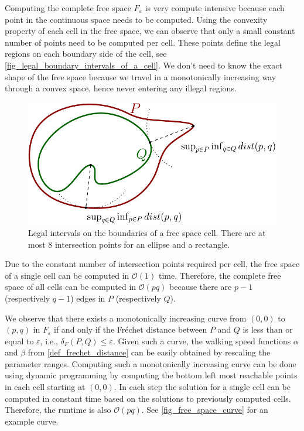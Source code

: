 \documentclass[
oneside,
fontsize=11pt
]{scrartcl}
\begin{document}
Computing the complete free space $F_\varepsilon$ is very compute intensive 
because each point in the continuous space needs to be computed. 
Using the convexity property of each cell in the free space,
we can observe that only a small constant number of points need to be computed per cell. 
These points define the legal regions on each boundary side of the cell, see \autoref{fig_legal_boundary_intervals_of_a_cell}. 
We don't need to know the exact shape of the free space 
because we travel in a monotonically increasing way through a convex space,
hence never entering any illegal regions.

\begin{figure}[ht]
  \centering
  \includegraphics[width=\textwidth]{images/hausdorff/hausdorff-distance-example.pdf}
  \caption[Legal intervals on free space cell boundary]{
    Legal intervals on the boundaries of a free space cell. 
    There are at most 8 intersection points for an ellipse and a rectangle.}
  \label{fig_legal_boundary_intervals_of_a_cell}
\end{figure}

Due to the constant number of intersection points required per cell, 
the free space of a single cell can be computed in $\mathcal{O}(1)$ time.
Therefore, the complete free space of all cells can be computed in $\mathcal{O}(pq)$
because there are $p-1$ (respectively $q-1$) edges in $P$ (respectively $Q$).

We observe that there exists 
a monotonically increasing curve from $(0,0)$ to $(p,q)$ in $F_\varepsilon$
if and only if the Fréchet distance between $P$ and $Q$ is less than or equal to $\varepsilon$,
i.e., $\delta_F(P,Q) \leq \varepsilon$.
Given such a curve, the walking speed functions $\alpha$ and $\beta$ from \autoref{def_frechet_distance}
can be easily obtained by rescaling the parameter ranges. 
Computing such a monotonically increasing curve can be done using dynamic programming 
by computing the bottom left most reachable points in each cell starting at $(0,0)$. 
In each step the solution for a single cell can be computed in constant time based on the 
solutions to previously computed cells. 
Therefore, the runtime is also $\mathcal{O}(pq)$. 
See \autoref{fig_free_space_curve} for an example curve. \cite{alt_computing_1995}
\end{document}
